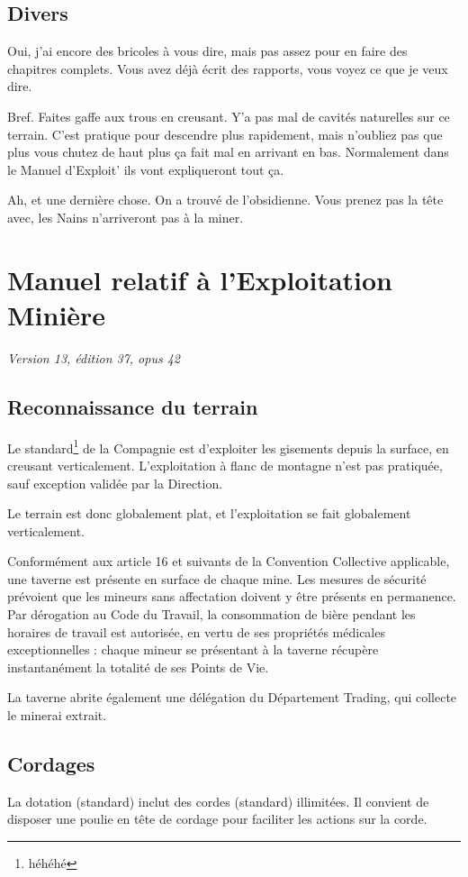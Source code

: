\subsection{Divers}
Oui, j'ai encore des bricoles à vous dire, mais pas assez pour en faire des chapitres complets. Vous avez déjà écrit des rapports, vous voyez ce que je veux dire.

Bref. Faites gaffe aux trous en creusant. Y'a pas mal de cavités naturelles sur ce terrain. C'est pratique pour descendre plus rapidement, mais n'oubliez pas que plus vous chutez de haut plus ça fait mal en arrivant en bas. Normalement dans le Manuel d'Exploit' ils vont expliqueront tout ça.

Ah, et une dernière chose. On a trouvé de l'obsidienne. Vous prenez pas la tête avec, les Nains n'arriveront pas à la miner.

\newpage
\section{Manuel relatif à l'Exploitation Minière}
\textit{Version 13, édition 37, opus 42}

\subsection{Reconnaissance du terrain}
Le standard\footnote{héhéhé} de la Compagnie est d'exploiter les gisements depuis la surface, en creusant verticalement. L'exploitation à flanc de montagne n'est pas pratiquée, sauf exception validée par la Direction.

Le terrain est donc globalement plat, et l'exploitation se fait globalement verticalement.

Conformément aux article 16 et suivants de la Convention Collective applicable, une taverne est présente en surface de chaque mine. Les mesures de sécurité prévoient que les mineurs sans affectation doivent y être présents en permanence. Par dérogation au Code du Travail, la consommation de bière pendant les horaires de travail est autorisée, en vertu de ses propriétés médicales exceptionnelles : chaque mineur se présentant à la taverne récupère instantanément la totalité de ses Points de Vie.

La taverne abrite également une délégation du Département Trading, qui collecte le minerai extrait.

\subsection{Cordages}
La dotation (standard) inclut des cordes (standard) illimitées. Il convient de disposer une poulie en tête de cordage pour faciliter les actions sur la corde.

